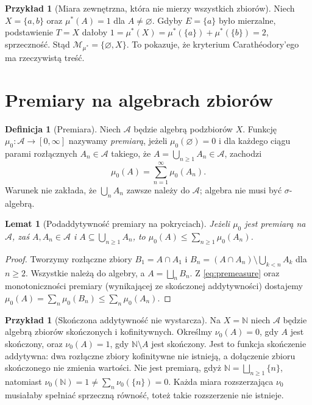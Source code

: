 \documentclass[11pt,a4paper,oneside]{book}
\numberwithin{equation}{chapter}
\theoremstyle{plain}
\newtheorem{lemat}[twierdzenie]{Lemat}
\theoremstyle{definition}
\newtheorem{definicja}[twierdzenie]{Definicja}
\newtheorem{przyklad}[twierdzenie]{Przykład}
\theoremstyle{remark}
\begin{document}
\begin{przyklad}[Miara zewnętrzna, która nie mierzy wszystkich zbiorów]
Niech $X=\{a,b\}$ oraz $\mu^*(A)=1$ dla $A\ne\varnothing$.
Gdyby $E=\{a\}$ było mierzalne, podstawienie $T=X$ dałoby
$1=\mu^*(X)=\mu^*(\{a\})+\mu^*(\{b\})=2$,
sprzeczność. Stąd $\mathcal M_{\mu^*}=\{\varnothing,X\}$.
To pokazuje, że kryterium Carathéodory'ego ma rzeczywistą treść.
\end{przyklad}

\section{Premiary na algebrach zbiorów}

\begin{definicja}[Premiara]
\label{def:premeasure}
Niech $\mathcal A$ będzie algebrą podzbiorów $X$.
Funkcję $\mu_0:\mathcal A\to[0,\infty]$ nazywamy
\emph{premiarą}, jeżeli $\mu_0(\varnothing)=0$ i dla każdego
ciągu parami rozłącznych $A_n\in\mathcal A$ takiego, że
$A=\bigcup_{n\ge1}A_n\in\mathcal A$, zachodzi
\begin{equation}\label{eq:premeasure}
\mu_0(A)=\sum_{n=1}^\infty\mu_0(A_n).
\end{equation}
Warunek nie zakłada, że $\bigcup_nA_n$ zawsze należy do
$\mathcal A$; algebra nie musi być $\sigma$-algebrą.
\end{definicja}

\begin{lemat}[Podaddytywność premiary na pokryciach]
\label{lem:premeasure-cover}
Jeżeli $\mu_0$ jest premiarą na $\mathcal A$, zaś
$A,A_n\in\mathcal A$ i $A\subseteq\bigcup_{n\ge1}A_n$,
to $\mu_0(A)\le\sum_{n\ge1}\mu_0(A_n)$.
\end{lemat}

\begin{proof}
Tworzymy rozłączne zbiory
$B_1=A\cap A_1$ i
$B_n=(A\cap A_n)\setminus\bigcup_{k<n}A_k$ dla $n\ge2$.
Wszystkie należą do algebry, a $A=\bigsqcup_nB_n$.
Z \eqref{eq:premeasure} oraz monotoniczności premiary
(wynikającej ze skończonej addytywności) dostajemy
$\mu_0(A)=\sum_n\mu_0(B_n)\le\sum_n\mu_0(A_n)$.
\end{proof}

\begin{przyklad}[Skończona addytywność nie wystarcza]
Na $X=\mathbb N$ niech $\mathcal A$ będzie algebrą
zbiorów skończonych i kofinitywnych. Określmy
$\nu_0(A)=0$, gdy $A$ jest skończony, oraz
$\nu_0(A)=1$, gdy $\mathbb N\setminus A$ jest skończony.
Jest to funkcja skończenie addytywna: dwa rozłączne
zbiory kofinitywne nie istnieją, a dołączenie zbioru
skończonego nie zmienia wartości. Nie jest premiarą, gdyż
$\mathbb N=\bigsqcup_{n\ge1}\{n\}$, natomiast
$\nu_0(\mathbb N)=1\ne\sum_n\nu_0(\{n\})=0$.
Każda miara rozszerzająca $\nu_0$ musiałaby spełniać
sprzeczną równość, toteż takie rozszerzenie nie istnieje.
\end{przyklad}
\end{document}
